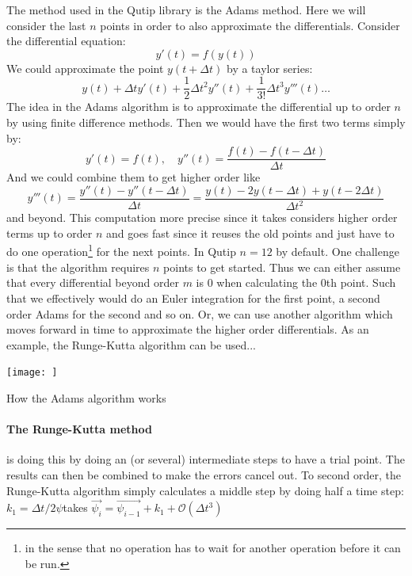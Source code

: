 The method used in the Qutip library is the Adams method. Here we will consider the last $n$ points in order to also approximate the differentials. Consider the differential equation:
\begin{equation}
    y'(t) = f(y(t))
\end{equation}
We could approximate the point $y(t+\Delta t)$ by a taylor series:
\begin{equation}
    y(t) + \Delta t y'(t) + \frac12 \Delta t^2 y''(t) + \frac{1}{3!} \Delta t^3 y'''(t)\dots 
\end{equation}
The idea in the Adams algorithm is to approximate the differential up to order $n$ by using finite difference methods. Then we would have the first two terms simply by:
\begin{equation}
    y'(t) = f(t), \quad y''(t) = \frac{f(t) - f(t - \Delta t)}{\Delta t} 
\end{equation}
And we could combine them to get higher order like
\begin{equation}
    y'''(t) = \frac{y''(t) - y''(t-\Delta t)}{\Delta t} = \frac{y(t) - 2y(t-\Delta t) + y(t-2\Delta t)}{\Delta t^2}
\end{equation}
and beyond. This computation more precise since it takes considers higher order terms up to order $n$ and goes fast since it reuses the old points and just have to do one operation\footnote{in the sense that no operation has to wait for another operation before it can be run.} for the next points. In Qutip $n=12$ by default. One challenge is that the algorithm requires $n$ points to get started. Thus we can either assume that every differential beyond order $m$ is $0$ when calculating the $0$th point. Such that we effectively would do an Euler integration for the first point, a second order Adams for the second and so on. Or, we can use another algorithm which moves forward in time to approximate the higher order differentials. As an example, the Runge-Kutta algorithm can be used...

\begin{marginfigure}
    \centering
    \texttt{[image: ]}
    \caption{How the Adams algorithm works}
    \label{fig:Adams integration}
\end{marginfigure}

\paragraph{The Runge-Kutta method} is doing this by doing an (or several) intermediate steps to have a trial point. The results can then be combined to make the errors cancel out. To second order, the Runge-Kutta algorithm simply calculates a middle step by doing half a time step: $k_1 = \Delta t / 2 \psi $takes $\Vec{\psi_i} = \Vec{\psi_{i-1}} + k_1 + \mathcal{O}(\Delta t^3)$

